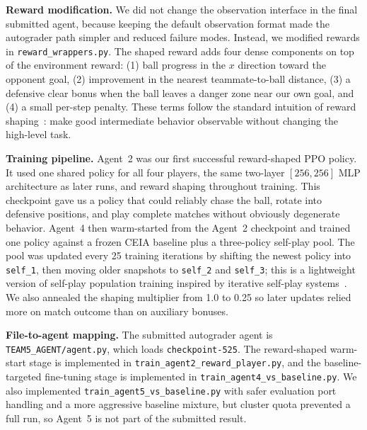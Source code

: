 \documentclass{article}
\begin{document}
\textbf{Reward modification.} We did not change the observation interface in the final submitted agent, because keeping the default observation format made the autograder path simpler and reduced failure modes. Instead, we modified rewards in \texttt{reward\_wrappers.py}. The shaped reward adds four dense components on top of the environment reward: (1) ball progress in the $x$ direction toward the opponent goal, (2) improvement in the nearest teammate-to-ball distance, (3) a defensive clear bonus when the ball leaves a danger zone near our own goal, and (4) a small per-step penalty. These terms follow the standard intuition of reward shaping~\citep{ng1999reward}: make good intermediate behavior observable without changing the high-level task.

\textbf{Training pipeline.} Agent~2 was our first successful reward-shaped PPO policy. It used one shared policy for all four players, the same two-layer $[256,256]$ MLP architecture as later runs, and reward shaping throughout training. This checkpoint gave us a policy that could reliably chase the ball, rotate into defensive positions, and play complete matches without obviously degenerate behavior. Agent~4 then warm-started from the Agent~2 checkpoint and trained one policy against a frozen CEIA baseline plus a three-policy self-play pool. The pool was updated every 25 training iterations by shifting the newest policy into \texttt{self\_1}, then moving older snapshots to \texttt{self\_2} and \texttt{self\_3}; this is a lightweight version of self-play population training inspired by iterative self-play systems~\citep{silver2017alphagozero}. We also annealed the shaping multiplier from 1.0 to 0.25 so later updates relied more on match outcome than on auxiliary bonuses.

\textbf{File-to-agent mapping.} The submitted autograder agent is \texttt{TEAM5\_AGENT/agent.py}, which loads \texttt{checkpoint-525}. The reward-shaped warm-start stage is implemented in \texttt{train\_agent2\_reward\_player.py}, and the baseline-targeted fine-tuning stage is implemented in \texttt{train\_agent4\_vs\_baseline.py}. We also implemented \texttt{train\_agent5\_vs\_baseline.py} with safer evaluation port handling and a more aggressive baseline mixture, but cluster quota prevented a full run, so Agent~5 is not part of the submitted result.
\end{document}
